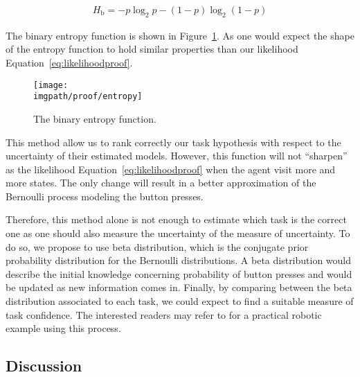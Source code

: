 \begin{eqnarray}
H_{\mathrm b}=-p\log_2 p - (1-p)\log_2(1-p) 
\label{eq:likelihoodentropy}
\end{eqnarray}

The binary entropy function is shown in Figure~\ref{fig:prooflikelihoodentropy}. As one would expect the shape of the entropy function to hold similar properties than our likelihood Equation~\ref{eq:likelihoodproof}.
    
\begin{figure}[!ht]
\centering
\texttt{[image: \\imgpath/proof/entropy]}
\caption{The binary entropy function.}
\label{fig:prooflikelihoodentropy}
\end{figure}

This method allow us to rank correctly our task hypothesis with respect to the uncertainty of their estimated models. However, this function will not ``sharpen'' as the likelihood Equation~\ref{eq:likelihoodproof} when the agent visit more and more states. The only change will result in a better approximation of the Bernoulli process modeling the button presses.

Therefore, this method alone is not enough to estimate which task is the correct one as one should also measure the uncertainty of the measure of uncertainty. To do so, we propose to use beta distribution, which is the conjugate prior probability distribution for the Bernoulli distributions. A beta distribution would describe the initial knowledge concerning probability of button presses and would be updated as new information comes in. Finally, by comparing between the beta distribution associated to each task, we could expect to find a suitable measure of task confidence. The interested readers may refer to \cite{montesano2012active} for a practical robotic example using this process.

\subsection{Discussion}


